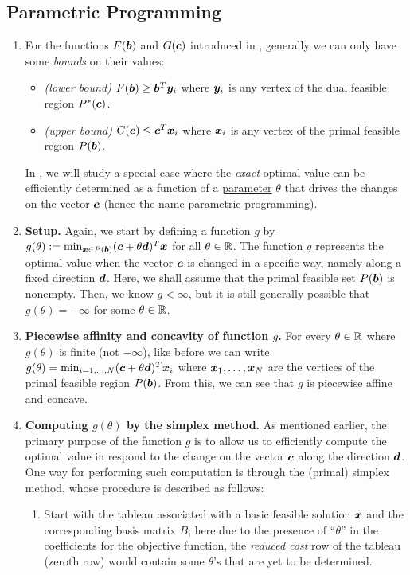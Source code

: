 \subsection{Parametric Programming}
\label{subsect:para-programming}
\begin{enumerate}
\item For the functions \(F(\bm{b})\) and \(G(\bm{c})\) introduced in
, generally we can only have some \emph{bounds} on
their values:
\begin{itemize}
\item \emph{(lower bound)} \(F(\bm{b})\ge \bm{b}^{T}\bm{y}_i\) where
\(\bm{y}_i\) is any vertex of the dual feasible region \(P^*(\bm{c})\).
\item \emph{(upper bound)} \(G(\bm{c})\le \bm{c}^{T}\bm{x}_i\) where
\(\bm{x}_i\) is any vertex of the primal feasible region \(P(\bm{b})\).
\end{itemize}
In , we will study a special case where the
\emph{exact} optimal value can be efficiently determined as a function of a
\underline{parameter} \(\theta\) that drives the changes on the vector
\(\bm{c}\) (hence the name \underline{parametric} programming).

\item \textbf{Setup.} Again, we start by defining a function \(g\) by
\(g(\theta):=\min_{\bm{x}\in
P(\bm{b})}(\bm{c}+\theta\bm{d})^{T}\bm{x}\) for all \(\theta\in\mathbb{R}\).
The function \(g\) represents the optimal value when the vector \(\bm{c}\) is
changed in a specific way, namely along a fixed direction \(\bm{d}\).  Here,
we shall assume that the primal feasible set \(P(\bm{b})\) is nonempty. Then,
we know \(g<\infty\), but it is still generally possible that
\(g(\theta)=-\infty\) for some \(\theta\in\mathbb{R}\).

\item \label{it:para-g-piecewise-affine-concave} \textbf{Piecewise affinity and
concavity of function \(g\).} For every \(\theta\in\mathbb{R}\) where \(g(\theta)\) is
finite (not \(-\infty\)), like before we can write
\(g(\theta)=\min_{i=1,\dotsc,N}(\bm{c}+\theta\bm{d})^{T}\bm{x}_i\) where
\(\bm{x}_1,\dotsc,\bm{x}_N\) are the vertices of the primal feasible region
\(P(\bm{b})\). From this, we can see that \(g\) is piecewise affine and
concave.
\item \label{it:cpt-g-proc} \textbf{Computing \(g(\theta)\) by the simplex
method.} As mentioned earlier, the primary purpose of the function \(g\) is to
allow us to efficiently compute the optimal value in respond to the change on
the vector \(\bm{c}\) along the direction \(\bm{d}\). One way for
performing such computation is through the (primal) simplex method, whose procedure is
described as follows:
\begin{enumerate}[label={(\arabic*)}]
\item Start with the tableau associated with a basic feasible solution
\(\bm{x}\) and the corresponding basis matrix \(B\); here due to the presence
of ``\(\theta\)'' in the coefficients for the objective function, the
\emph{reduced cost} row of the tableau (zeroth row) would contain some
\(\theta\)'s that are yet to be determined.


\end{enumerate}
\end{enumerate}
